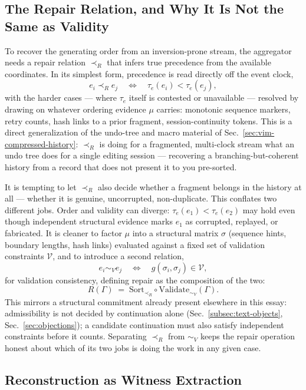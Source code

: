 \documentclass[12pt,a4paper]{article}
\theoremstyle{plain}
\theoremstyle{definition}
\theoremstyle{remark}
\begin{document}
\subsection{The Repair Relation, and Why It Is Not the Same as Validity}
\label{subsec:repair-relation}

To recover the generating order from an inversion-prone stream, the aggregator needs a repair relation $\prec_R$ that infers true precedence from the available coordinates. In its simplest form, precedence is read directly off the event clock,
\[
e_i \prec_R e_j \quad \Longleftrightarrow \quad \tau_e(e_i) < \tau_e(e_j),
\]
with the harder cases — where $\tau_e$ itself is contested or unavailable — resolved by drawing on whatever ordering evidence $\mu$ carries: monotonic sequence markers, retry counts, hash links to a prior fragment, session-continuity tokens. This is a direct generalization of the undo-tree and macro material of Sec.~\ref{sec:vim-compressed-history}: $\prec_R$ is doing for a fragmented, multi-clock stream what an undo tree does for a single editing session — recovering a branching-but-coherent history from a record that does not present it to you pre-sorted.

It is tempting to let $\prec_R$ also decide whether a fragment belongs in the history at all — whether it is genuine, uncorrupted, non-duplicate. This conflates two different jobs. Order and validity can diverge: $\tau_e(e_1) < \tau_e(e_2)$ may hold even though independent structural evidence marks $e_1$ as corrupted, replayed, or fabricated. It is cleaner to factor $\mu$ into a structural matrix $\sigma$ (sequence hints, boundary lengths, hash links) evaluated against a fixed set of validation constraints $\mathcal{V}$, and to introduce a second relation,
\[
e_i \sim_V e_j \quad \Longleftrightarrow \quad g(\sigma_i, \sigma_j) \in \mathcal{V},
\]
for validation consistency, defining repair as the composition of the two:
\[
R(\Gamma) \;=\; \mathrm{Sort}_{\prec_R} \circ \mathrm{Validate}_{\sim_V}(\Gamma).
\]
This mirrors a structural commitment already present elsewhere in this essay: admissibility is not decided by continuation alone (Sec.~\ref{subsec:text-objects}, Sec.~\ref{sec:objections}); a candidate continuation must also satisfy independent constraints before it counts. Separating $\prec_R$ from $\sim_V$ keeps the repair operation honest about which of its two jobs is doing the work in any given case.

\subsection{Reconstruction as Witness Extraction}
\label{subsec:witness-extraction}
\end{document}
